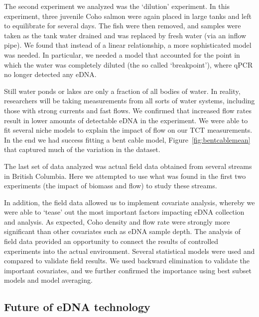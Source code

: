 \vspace{5mm}

The second experiment we analyzed was the `dilution' experiment.  In this experiment, three juvenile Coho salmon were again placed in large tanks and left to equilibrate for several days. The fish were then removed, and samples were taken as the tank water drained and was replaced by fresh water (via an inflow pipe). We found that instead of a linear relationship, a more sophisticated model was needed. In particular, we needed a model that accounted for the point in which the water was completely diluted (the so called `breakpoint'), where qPCR no longer detected any eDNA. 
\vspace{5mm}

Still water ponds or lakes are only a fraction of all bodies of water. In reality, researchers will be taking measurements from all sorts of water systems, including those with strong currents and fast flows. We confirmed that increased flow rates result in lower amounts of detectable eDNA in the experiment. We were able to fit several niche models to explain the impact of flow on our TCT measurements. In the end we had success fitting a bent cable model, Figure~\ref{fig:bentcablemean} that captured much of the variation in the dataset.

\vspace{5mm}

The last set of data analyzed was actual field data obtained from several streams in British Columbia. Here we attempted to use what was found in the first two experiments (the impact of biomass and flow) to study these streams. 

\vspace{5mm}

In addition, the field data allowed us to implement covariate analysis, whereby we were able to `tease' out the most important factors impacting eDNA collection and analysis. As expected, Coho density and flow rate were strongly more significant than other covariates such as eDNA sample depth. The analysis of field data provided an opportunity to connect the results of controlled experiments into the actual environment. Several statistical models were used and compared to validate field results. We used backward elimination to validate the important covariates, and we further confirmed the importance using best subset models and model averaging.

\newpage

\subsection{Future of eDNA technology}


